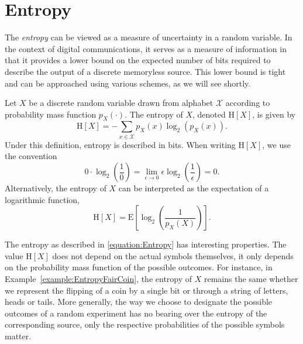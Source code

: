 \section{Entropy}

The \emph{entropy} can be viewed as a measure of uncertainty in a random variable.
In the context of digital communications, it serves as a measure of information in that it provides a lower bound on the expected number of bits required to describe the output of a discrete memoryless source.
This lower bound is tight and can be approached using various schemes, as we will see shortly.

\begin{definition}[Entropy]
Let $X$ be a discrete random variable drawn from alphabet $\mathcal{X}$ according to probability mass function $p_X(\cdot)$.
The entropy of $X$, denoted $\mathrm{H}[X]$, is given by
\begin{equation} \label{equation:Entropy}
\mathrm{H}[X] = - \sum_{x \in \mathcal{X}} p_X (x) \log_2 ( p_X(x) ) .
\end{equation}
Under this definition, entropy is described in bits.
When writing $\mathrm{H}[X]$, we use the convention
\begin{equation*}
0 \cdot \log_2 \left( \frac{1}{0} \right)
= \lim_{\epsilon \rightarrow 0} \epsilon \log_2 \left( \frac{1}{\epsilon} \right)
= 0 .
\end{equation*}
Alternatively, the entropy of $X$ can be interpreted as the expectation of a logarithmic function,
\begin{equation*}
\mathrm{H}[X] = \mathrm{E} \left[ \log_2 \left( \frac{1}{p_X(X)} \right) \right] .
\end{equation*}
\end{definition}

The entropy as described in \eqref{equation:Entropy} has interesting properties.
The value $\mathrm{H}[X]$ does not depend on the actual symbols themselves, it only depends on the probability mass function of the possible outcomes.
For instance, in Example~\ref{example:EntropyFairCoin}, the entropy of $X$ remains the same whether we represent the flipping of a coin by a single bit or through a string of letters, heads or tails.
More generally, the way we choose to designate the possible outcomes of a random experiment has no bearing over the entropy of the corresponding source, only the respective probabilities of the possible symbols matter.

